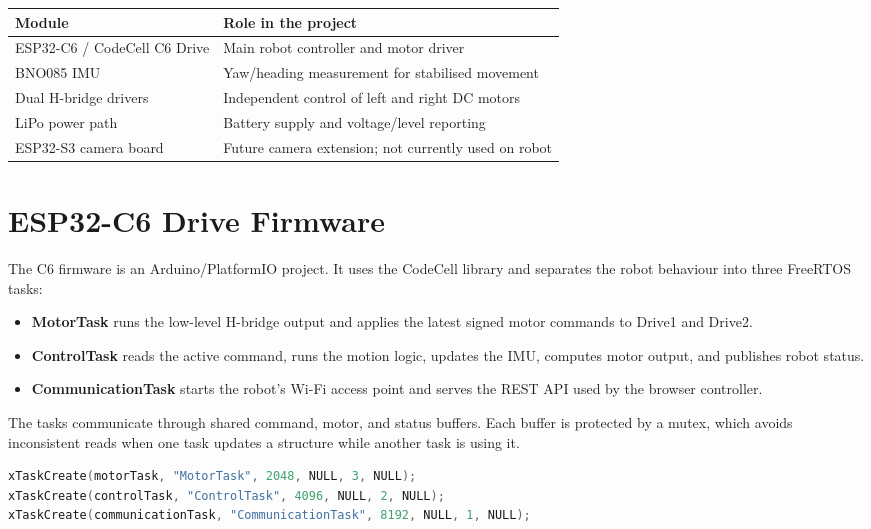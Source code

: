 \documentclass[11pt,a4paper]{article}
\begin{document}
\begin{table}[h]
\centering
\begin{tabular}{@{}ll@{}}
\toprule
Module & Role in the project \\
\midrule
ESP32-C6 / CodeCell C6 Drive & Main robot controller and motor driver \\
BNO085 IMU & Yaw/heading measurement for stabilised movement \\
Dual H-bridge drivers & Independent control of left and right DC motors \\
LiPo power path & Battery supply and voltage/level reporting \\
ESP32-S3 camera board & Future camera extension; not currently used on robot \\
\bottomrule
\end{tabular}
\end{table}

\section{ESP32-C6 Drive Firmware}

The C6 firmware is an Arduino/PlatformIO project. It uses the CodeCell library
and separates the robot behaviour into three FreeRTOS tasks:

\begin{itemize}
  \item \textbf{MotorTask} runs the low-level H-bridge output and applies the
  latest signed motor commands to Drive1 and Drive2.
  \item \textbf{ControlTask} reads the active command, runs the motion logic,
  updates the IMU, computes motor output, and publishes robot status.
  \item \textbf{CommunicationTask} starts the robot's Wi-Fi access point and
  serves the REST API used by the browser controller.
\end{itemize}

The tasks communicate through shared command, motor, and status buffers. Each
buffer is protected by a mutex, which avoids inconsistent reads when one task
updates a structure while another task is using it.

\begin{lstlisting}[language=C++,caption={Task startup on the ESP32-C6}]
xTaskCreate(motorTask, "MotorTask", 2048, NULL, 3, NULL);
xTaskCreate(controlTask, "ControlTask", 4096, NULL, 2, NULL);
xTaskCreate(communicationTask, "CommunicationTask", 8192, NULL, 1, NULL);
\end{lstlisting}
\end{document}

